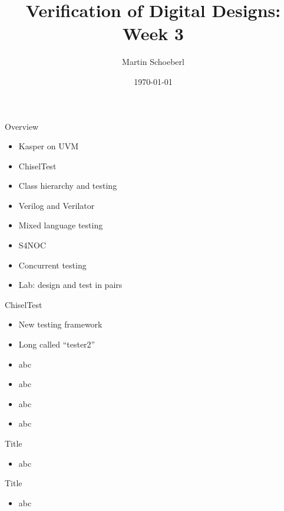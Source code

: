 

\newif\ifbook


\title{Verification of Digital Designs: Week 3}
\author{Martin Schoeberl}
\date{\today}



\begin{frame}
\titlepage
\end{frame}

\begin{frame}[fragile]{Overview}
\begin{itemize}
\item Kasper on UVM
\item ChiselTest
\item Class hierarchy and testing
\item Verilog and Verilator
\item Mixed language testing
\item S4NOC
\item Concurrent testing
\item Lab: design and test in pairs
\end{itemize}
\end{frame}

\begin{frame}[fragile]{ChiselTest}
\begin{itemize}
\item New testing framework
\item Long called ``tester2''
\item abc
\item abc
\item abc
\item abc
\end{itemize}
\end{frame}

\begin{frame}[fragile]{Title}
\begin{itemize}
\item abc
\end{itemize}
\end{frame}

\begin{frame}[fragile]{Title}
\begin{itemize}
\item abc
\end{itemize}
\end{frame}

